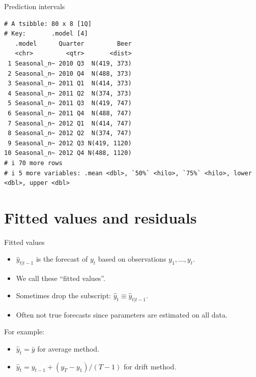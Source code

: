 \documentclass[
  14pt,
  ignorenonframetext,
  aspectratio=169,
]{beamer}
\newenvironment{Shaded}{\begin{snugshade}}{\end{snugshade}}
\newcommand{\AttributeTok}[1]{\textcolor[rgb]{0.13,0.29,0.53}{#1}}
\newcommand{\DecValTok}[1]{\textcolor[rgb]{0.00,0.00,0.81}{#1}}
\newcommand{\FunctionTok}[1]{\textcolor[rgb]{0.13,0.29,0.53}{\textbf{#1}}}
\newcommand{\NormalTok}[1]{#1}
\newcommand{\SpecialCharTok}[1]{\textcolor[rgb]{0.81,0.36,0.00}{\textbf{#1}}}
\newcommand{\StringTok}[1]{\textcolor[rgb]{0.31,0.60,0.02}{#1}}
\providecommand{\tightlist}{%
  \setlength{\itemsep}{0pt}\setlength{\parskip}{0pt}}
\renewenvironment{Shaded}{\vspace*{0.15cm}\color{black}\fontsize{10}{10}\sf\begin{snugshade}\color{black}}{\end{snugshade}}
\begin{document}
\begin{frame}[fragile]{Prediction intervals}
\protect{}\label{prediction-intervals-2}
\fontsize{10}{12}\sf

\begin{Shaded}
\end{Shaded}

\begin{verbatim}
# A tsibble: 80 x 8 [1Q]
# Key:       .model [4]
   .model      Quarter         Beer
   <chr>         <qtr>       <dist>
 1 Seasonal_n~ 2010 Q3  N(419, 373)
 2 Seasonal_n~ 2010 Q4  N(488, 373)
 3 Seasonal_n~ 2011 Q1  N(414, 373)
 4 Seasonal_n~ 2011 Q2  N(374, 373)
 5 Seasonal_n~ 2011 Q3  N(419, 747)
 6 Seasonal_n~ 2011 Q4  N(488, 747)
 7 Seasonal_n~ 2012 Q1  N(414, 747)
 8 Seasonal_n~ 2012 Q2  N(374, 747)
 9 Seasonal_n~ 2012 Q3 N(419, 1120)
10 Seasonal_n~ 2012 Q4 N(488, 1120)
# i 70 more rows
# i 5 more variables: .mean <dbl>, `50%` <hilo>, `75%` <hilo>, lower <dbl>, upper <dbl>
\end{verbatim}
\end{frame}

\section{Fitted values and residuals}\label{fitted-values-and-residuals}

\begin{frame}{Fitted values}
\protect{}\label{fitted-values}
\begin{itemize}
\tightlist
\item
  \(\hat{y}_{t|t-1}\) is the forecast of \(y_t\) based on observations
  \(y_1,\dots,y_t\).
\item
  We call these ``fitted values''.
\item
  Sometimes drop the subscript: \(\hat{y}_t \equiv \hat{y}_{t|t-1}\).
\item
  Often not true forecasts since parameters are estimated on all data.
\end{itemize}

\begin{block}{For example:}
\protect{}\label{for-example}
\begin{itemize}
\tightlist
\item
  \(\hat{y}_{t} = \bar{y}\) for average method.
\item
  \(\hat{y}_{t} = y_{t-1} + (y_{T}-y_1)/(T-1)\) for drift method.
\end{itemize}
\end{block}
\end{frame}
\end{document}
